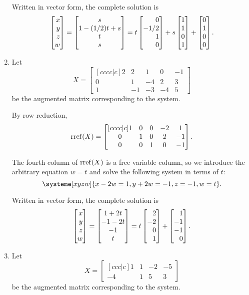 \begin{exercises}
\begin{problist}
\begin{solution}
\begin{enumerate}
				Written in vector form, the complete solution is
				\[
					\mat{x\\y\\z\\w} = \matc{s\\1-(1/2)t+s\\t\\s}
					=t\mat{0\\-1/2\\1\\0}+s\mat{1\\1\\0\\1}+\mat{0\\1\\0\\0}.
				\]
				\item 
				Let
				\[
					X=
					\begin{bmatrix}[cccc|c]
						2 & 2 & 1 & 0 & -1\\
						0 & 1 & -4 & 2 & 3\\
						1 & -1 & -3 & -4 & 5
					\end{bmatrix}
				\]
				be the augmented matrix corresponding to the system.
				
				By row reduction,
				\[
					\operatorname{rref}(X)=
					\begin{bmatrix}[cccc|c]
						1 & 0 & 0 & -2 & 1\\
						0 & 1 & 0 & 2 & -1\\
						0 & 0 & 1 & 0 & -1
					\end{bmatrix}.
				\]
				
				The fourth column of $\operatorname{rref}(X)$ is a free variable column,
				so we introduce the arbitrary equation $w=t$ and solve the following system
				in terms of $t$:
				\[
					\systeme[xyzw]{x-2w=1,y+2w=-1,z=-1,w=t}.
				\]
				
				Written in vector form, the complete solution is
				\[
				\mat{x\\y\\z\\w} = \matc{1+2t\\-1-2t\\-1\\t} = t\mat{2\\-2\\0\\1}+\mat{1\\-1\\-1\\0}.
				\]
				\item 
				Let
				\[
					X=
					\begin{bmatrix}[ccc|c]
						1 & 1 & -2 & -5\\
						-4 & 1 & 5 & 3
					\end{bmatrix}
				\]
				be the augmented matrix corresponding to the system.
				

\end{enumerate}
\end{solution}
\end{problist}
\end{exercises}
